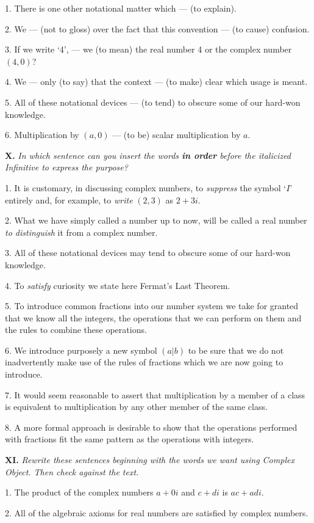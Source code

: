 \documentclass[a4paper]{article}
\newcommand{\ETask}[2]{\medskip\par\textbf{#1.} \textit{#2}\par}
\begin{document}
1. There is one other notational matter which --- (to explain).

2. We --- (not to gloss) over the fact that this convention --- (to cause) confusion.

3. If we write `4', --- we (to mean) the real number 4 or the complex number $(4,0)$?

4. We --- only (to say) that the context --- (to make) clear which usage is meant.

5. All of these notational devices --- (to tend) to obscure some of our hard-won knowledge.

6. Multiplication by $(a,0)$ --- (to be) scalar multiplication by $a$.

\ETask{X}{In which sentence can you insert the words \textbf{in order} before the italicized Infinitive to express the purpose?}

1. It is customary, in discussing complex numbers, to \textit{suppress} the symbol `$I$' entirely and, for example, to \textit{write}
$(2,3)$ as $2+3i$.

2. What we have simply called a number up to now, will be called a real number \textit{to distinguish} it from a complex number.

3. All of these notational devices may tend to obscure some of our hard-won knowledge.

4. To \textit{satisfy} curiosity we state here Fermat's Last Theorem.

5. To introduce common fractions into our number system we take for granted that we know all the integers, the operations
that we can perform on them and the rules to combine these operations.

6. We introduce purposely a new symbol $(a|b)$ to be sure that we do not inadvertently make use of the rules of fractions which
we are now going to introduce.

7. It would seem reasonable to assert that multiplication by a member of a class is equivalent to multiplication by any
other member of the same class.

8. A more formal approach is desirable to show that the operations performed with fractions fit the same pattern as the
operations with integers.

\ETask{XI}{Rewrite these sentences beginning with the words we want using Complex Object. Then check against the text.}

1. The product of the complex numbers $a + 0i$ and $c+di$ is $ac + adi$.

2. All of the algebraic axioms for real numbers are satisfied by complex numbers.
\end{document}
